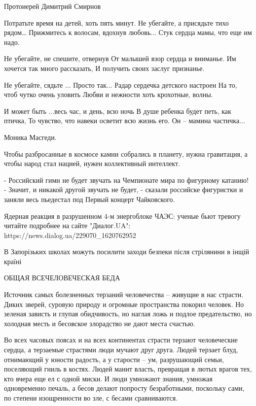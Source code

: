 Протоиерей Димитрий Смирнов

Потратьте время на детей, хоть пять минут. 
Не убегайте, а присядьте тихо рядом… 
Прижмитесь к волосам, вдохнув любовь... 
Стук сердца мамы, что еще им надо. 

Не убегайте, не спешите, отвернув 
От малышей взор сердца и вниманье. 
Им хочется так много рассказать, 
И получить своих заслуг признанье. 

Не убегайте, сядьте ... Просто так... 
Радар сердечка детского настроен 
На то, чтоб чутко очень уловить 
Любви и нежности хоть крохотные, волны. 

И может быть ...весь час, и день, всю ночь 
В душе ребенка будет петь, как птичка, 
То чувство, что навеки осветит всю жизнь его. 
Он – мамина частичка... 

Моника Масгеди.

Чтобы разбросанные в космосе камни собрались в планету, нужна гравитация, а
чтобы народ стал нацией, нужен коллективный интеллект. 

- Российский гимн не будет звучать на Чемпионате мира по фигурному катанию!
- Значит, и никакой другой звучать не будет, - сказали российске фигуристки и заняли весь пьедестал под Первый концерт Чайковского.

Ядерная реакция в разрушенном 4-м энергоблоке ЧАЭС: ученые бьют тревогу
читайте подробнее на сайте "Диалог.UA": https://news.dialog.ua/229070_1620762952

В Запорізьких школах можуть посилити заходи безпеки після стрілянини в інщій країні

ОБЩАЯ ВСЕЧЕЛОВЕЧЕСКАЯ БЕДА 

Источник самых болезненных терзаний человечества – живущие в нас страсти. Диких
зверей, суровую природу и огромные пространства покорил человек. Но зеленая
зависть и глупая обидчивость, но наглая ложь и подлое предательство, но
холодная месть и бесовское злорадство не дают места счастью. 

Во всех часовых поясах и на всех континентах страсти терзают человеческие
сердца, а терзаемые страстями люди мучают друг друга. Людей терзает блуд,
отнимающий у юности радость, а у старости – ум, разрушающий семьи, поселяющий
гниль в костях. Людей манит власть, превращая в лютых врагов тех, кто вчера еще
ел с одной миски. И люди умножают знания, умножая одновременно печаль, а бесов
делают попросту безработными, поскольку сами, по степени изощренности во зле, с
бесами сравниваются. 

